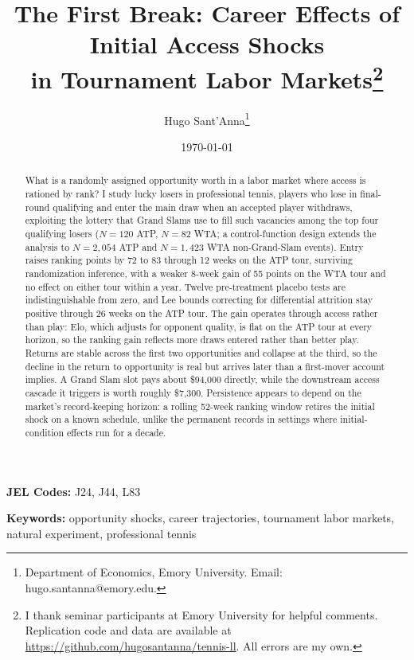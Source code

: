 \documentclass[12pt]{article}
\title{The First Break: Career Effects of Initial Access Shocks\\ in Tournament Labor Markets\thanks{I thank seminar participants at Emory University for helpful comments. Replication code and data are available at \url{https://github.com/hugosantanna/tennis-ll}. All errors are my own.}}
\author{Hugo Sant'Anna\thanks{Department of Economics, Emory University. Email: hugo.santanna@emory.edu.}}
\date{\today}
\begin{document}
\maketitle
\thispagestyle{empty}

\begin{abstract}
\noindent \singlespacing
What is a randomly assigned opportunity worth in a labor market where access is rationed by rank? I study lucky losers in professional tennis, players who lose in final-round qualifying and enter the main draw when an accepted player withdraws, exploiting the lottery that Grand Slams use to fill such vacancies among the top four qualifying losers ($N = 120$ ATP, $N = 82$ WTA; a control-function design extends the analysis to $N = 2{,}054$ ATP and $N = 1{,}423$ WTA non-Grand-Slam events). Entry raises ranking points by 72 to 83 through 12 weeks on the ATP tour, surviving randomization inference, with a weaker 8-week gain of 55 points on the WTA tour and no effect on either tour within a year. Twelve pre-treatment placebo tests are indistinguishable from zero, and Lee bounds correcting for differential attrition stay positive through 26 weeks on the ATP tour. The gain operates through access rather than play: Elo, which adjusts for opponent quality, is flat on the ATP tour at every horizon, so the ranking gain reflects more draws entered rather than better play. Returns are stable across the first two opportunities and collapse at the third, so the decline in the return to opportunity is real but arrives later than a first-mover account implies. A Grand Slam slot pays about \$94{,}000 directly, while the downstream access cascade it triggers is worth roughly \$7{,}300. Persistence appears to depend on the market's record-keeping horizon: a rolling 52-week ranking window retires the initial shock on a known schedule, unlike the permanent records in settings where initial-condition effects run for a decade.
\end{abstract}

\vspace{1em}
\noindent \textbf{JEL Codes:} J24, J44, L83

\vspace{0.5em}
\noindent \textbf{Keywords:} opportunity shocks, career trajectories, tournament labor markets, natural experiment, professional tennis

\newpage
\setcounter{page}{1}


\end{document}
